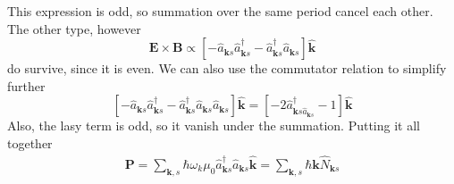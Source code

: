 \documentclass[../../../main.tex]{subfiles}
\begin{document}
This expression is odd, so summation over the same period cancel each other.
The other type, however 
\begin{equation*}
  \mathbf{E }\times \mathbf{B}  \propto
  \left[ -\hat{a}_{\mathbf{k }s} \hat{a}^\dagger_{\mathbf{k }s} - \hat{a}^\dagger_{\mathbf{k }s} \hat{a}_{\mathbf{k }s}  \right] \mathbf{\hat{k}}
\end{equation*}
do survive, since it is even.
We can also use the commutator relation to simplify further
\begin{equation*}
  \left[ -\hat{a}_{\mathbf{k }s} \hat{a}^\dagger_{\mathbf{k }s} - \hat{a}^\dagger_{\mathbf{k }s} \hat{a}_{\mathbf{k }s}    \hat{a}_{\mathbf{k }s}   \right] \hat{\mathbf{k}}
   = \left[ - 2\hat{a}^\dagger_{\mathbf{k }s \hat{a}_{\mathbf{k }s}  } -1\right] \mathbf{\hat{k}}
\end{equation*}
Also, the lasy term is odd, so it vanish under the summation.
Putting it all together
\begin{align*}
  \mathbf{P } = 
  \sum_{\mathbf{k },s } \hbar \omega_k \mu_0 \hat{a}^\dagger_{\mathbf{k }s} \hat{a}_{\mathbf{k }s}  \mathbf{\hat{k }}
  = \sum_{\mathbf{k },s}\hbar \mathbf{k } \hat{N }_{\mathbf{k }s} 
\end{align*}
\end{document}
